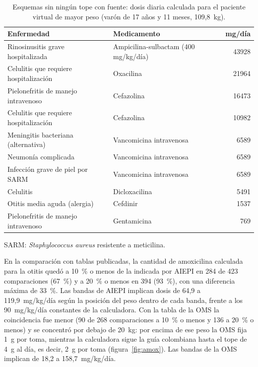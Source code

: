 \documentclass[11pt,a4paper]{article}
\begin{document}
\begin{table}[htbp]
\centering
\caption{Esquemas sin ningún tope con fuente: dosis diaria calculada para el paciente virtual de mayor peso (varón de 17 años y 11 meses, 109,8~kg).}
\label{tab:sintope}
\small
\begin{tabular}{@{}llr@{}}
\toprule
Enfermedad & Medicamento & mg/día \\
\midrule
Rinosinusitis grave hospitalizada & Ampicilina-sulbactam (400 mg/kg/día) & \num{43928} \\
Celulitis que requiere hospitalización & Oxacilina & \num{21964} \\
Pielonefritis de manejo intravenoso & Cefazolina & \num{16473} \\
Celulitis que requiere hospitalización & Cefazolina & \num{10982} \\
Meningitis bacteriana (alternativa) & Vancomicina intravenosa & \num{6589} \\
Neumonía complicada & Vancomicina intravenosa & \num{6589} \\
Infección grave de piel por SARM & Vancomicina intravenosa & \num{6589} \\
Celulitis & Dicloxacilina & \num{5491} \\
Otitis media aguda (alergia) & Cefdinir & \num{1537} \\
Pielonefritis de manejo intravenoso & Gentamicina & 769 \\
\bottomrule
\end{tabular}

\vspace{2pt}
\begin{minipage}{0.75\textwidth}\footnotesize
SARM: \emph{Staphylococcus aureus} resistente a meticilina.
\end{minipage}
\end{table}

En la comparación con tablas publicadas, la cantidad de amoxicilina calculada para la otitis quedó a 10~\% o menos de la indicada por AIEPI en 284 de 423 comparaciones (67~\%) y a 20~\% o menos en 394 (93~\%), con una diferencia máxima de 33~\%. Las bandas de AIEPI implican dosis de 64,9 a 119,9~mg/kg/día según la posición del peso dentro de cada banda, frente a los 90~mg/kg/día constantes de la calculadora. Con la tabla de la OMS la coincidencia fue menor (90 de 268 comparaciones a 10~\% o menos y 136 a 20~\% o menos) y se concentró por debajo de 20~kg: por encima de ese peso la OMS fija 1~g por toma, mientras la calculadora sigue la guía colombiana hasta el tope de 4~g al día, es decir, 2~g por toma (figura~\ref{fig:amox}). Las bandas de la OMS implican de 18,2 a 158,7~mg/kg/día.
\end{document}
